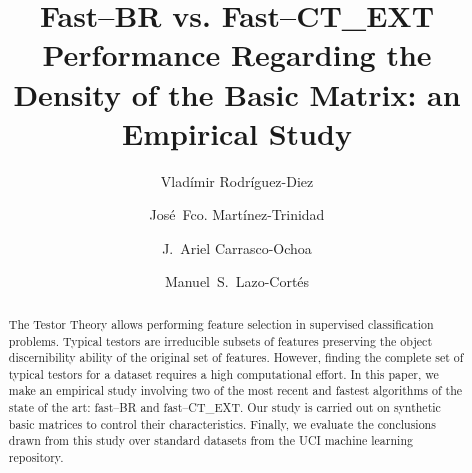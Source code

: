 \documentclass[citenumber]{llncs}
\begin{document}
\mainmatter              %
%
\title{Fast--BR vs. Fast--CT\_EXT Performance Regarding the Density of the Basic Matrix: an Empirical Study	}
%
			 
\author{Vlad\'{i}mir Rodr\'{i}guez-Diez \and Jos\'{e}~Fco. Mart\'{i}nez-Trinidad
		 \and J.~Ariel Carrasco-Ochoa \and Manuel~S.~Lazo-Cortés}
%
%
%


\maketitle              %

\begin{abstract}
	The Testor Theory allows performing feature selection in supervised classification problems. Typical testors are irreducible subsets of features preserving the object discernibility ability of the original set of features. However, finding the complete set of typical testors for a dataset requires a high computational effort.	In this paper, we make an empirical study involving two of the most recent and fastest algorithms of the state of the art: fast--BR and fast--CT\_EXT. Our study is carried out on synthetic basic matrices to control their characteristics. Finally, we evaluate the conclusions drawn from this study over standard datasets from the UCI machine learning repository.

\end{abstract}
%
\end{document}
